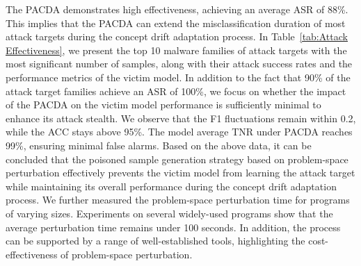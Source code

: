 \documentclass[conference,compsoc]{IEEEtran} %
\begin{document}

The PACDA demonstrates high effectiveness, achieving an average ASR of 88\%.
This implies that the PACDA can extend the misclassification duration of most attack targets during the concept drift adaptation process.
In Table~\ref{tab:Attack Effectiveness}, we present the top 10 malware families of attack targets with the most significant number of samples, along with their attack success rates and the performance metrics of the victim model.
In addition to the fact that 90\% of the attack target families achieve an ASR of 100\%, we focus on whether the impact of the PACDA on the victim model  performance is sufficiently minimal to enhance its attack stealth.
We observe that the F1 fluctuations remain within 0.2, while the ACC stays above 95\%.
The model  average TNR under PACDA reaches 99\%, ensuring minimal false alarms.
Based on the above data, it can be concluded that the poisoned sample generation strategy based on problem-space perturbation effectively prevents the victim model from learning the attack target while maintaining its overall performance during the concept drift adaptation process. 
We further measured the problem-space perturbation time for programs of varying sizes. Experiments on several widely-used programs show that the average perturbation time remains under 100 seconds.
In addition, the process can be supported by a range of well-established tools, highlighting the cost-effectiveness of problem-space perturbation.
\end{document}
